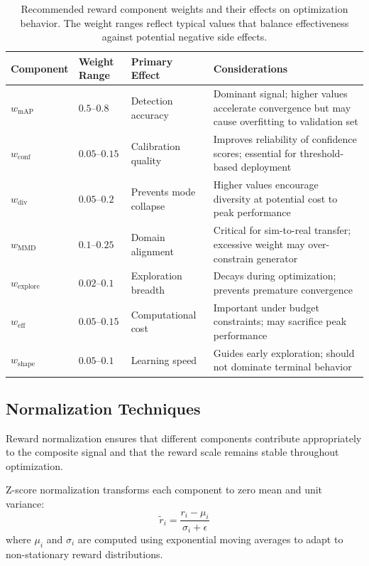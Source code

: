 \begin{table}[t]
\centering
\caption{Recommended reward component weights and their effects on optimization behavior. The weight ranges reflect typical values that balance effectiveness against potential negative side effects.}
\label{tab:reward_weights}
\begin{tabular}{p{2.5cm}p{2cm}p{2.5cm}p{5cm}}
\toprule
\textbf{Component} & \textbf{Weight Range} & \textbf{Primary Effect} & \textbf{Considerations} \\
\midrule
$w_{\text{mAP}}$ & $0.5$--$0.8$ & Detection accuracy & Dominant signal; higher values accelerate convergence but may cause overfitting to validation set \\
\addlinespace
$w_{\text{conf}}$ & $0.05$--$0.15$ & Calibration quality & Improves reliability of confidence scores; essential for threshold-based deployment \\
\addlinespace
$w_{\text{div}}$ & $0.05$--$0.2$ & Prevents mode collapse & Higher values encourage diversity at potential cost to peak performance \\
\addlinespace
$w_{\text{MMD}}$ & $0.1$--$0.25$ & Domain alignment & Critical for sim-to-real transfer; excessive weight may over-constrain generator \\
\addlinespace
$w_{\text{explore}}$ & $0.02$--$0.1$ & Exploration breadth & Decays during optimization; prevents premature convergence \\
\addlinespace
$w_{\text{eff}}$ & $0.05$--$0.15$ & Computational cost & Important under budget constraints; may sacrifice peak performance \\
\addlinespace
$w_{\text{shape}}$ & $0.05$--$0.1$ & Learning speed & Guides early exploration; should not dominate terminal behavior \\
\bottomrule
\end{tabular}
\end{table}

\subsection{Normalization Techniques}

Reward normalization ensures that different components contribute appropriately to the composite signal and that the reward scale remains stable throughout optimization.

Z-score normalization transforms each component to zero mean and unit variance:
\begin{equation}
\tilde{r}_i = \frac{r_i - \mu_i}{\sigma_i + \epsilon}
\label{eq:zscore_normalization}
\end{equation}
where $\mu_i$ and $\sigma_i$ are computed using exponential moving averages to adapt to non-stationary reward distributions.

